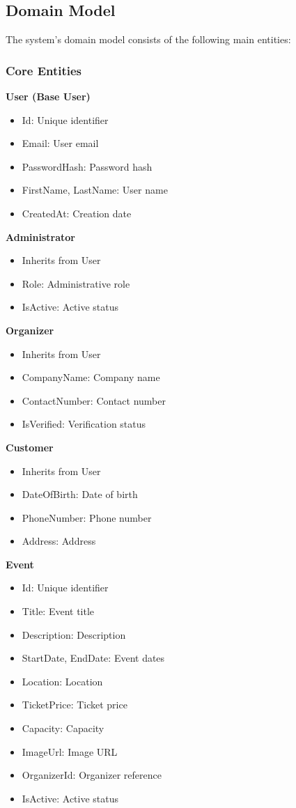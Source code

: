 \documentclass[12pt,a4paper]{article}
\begin{document}
\subsection{Domain Model}

The system's domain model consists of the following main entities:

\subsubsection{Core Entities}

\textbf{User (Base User)}
\begin{itemize}
    \item Id: Unique identifier
    \item Email: User email
    \item PasswordHash: Password hash
    \item FirstName, LastName: User name
    \item CreatedAt: Creation date
\end{itemize}

\textbf{Administrator}
\begin{itemize}
    \item Inherits from User
    \item Role: Administrative role
    \item IsActive: Active status
\end{itemize}

\textbf{Organizer}
\begin{itemize}
    \item Inherits from User
    \item CompanyName: Company name
    \item ContactNumber: Contact number
    \item IsVerified: Verification status
\end{itemize}

\textbf{Customer}
\begin{itemize}
    \item Inherits from User
    \item DateOfBirth: Date of birth
    \item PhoneNumber: Phone number
    \item Address: Address
\end{itemize}

\textbf{Event}
\begin{itemize}
    \item Id: Unique identifier
    \item Title: Event title
    \item Description: Description
    \item StartDate, EndDate: Event dates
    \item Location: Location
    \item TicketPrice: Ticket price
    \item Capacity: Capacity
    \item ImageUrl: Image URL
    \item OrganizerId: Organizer reference
    \item IsActive: Active status
\end{itemize}
\end{document}
